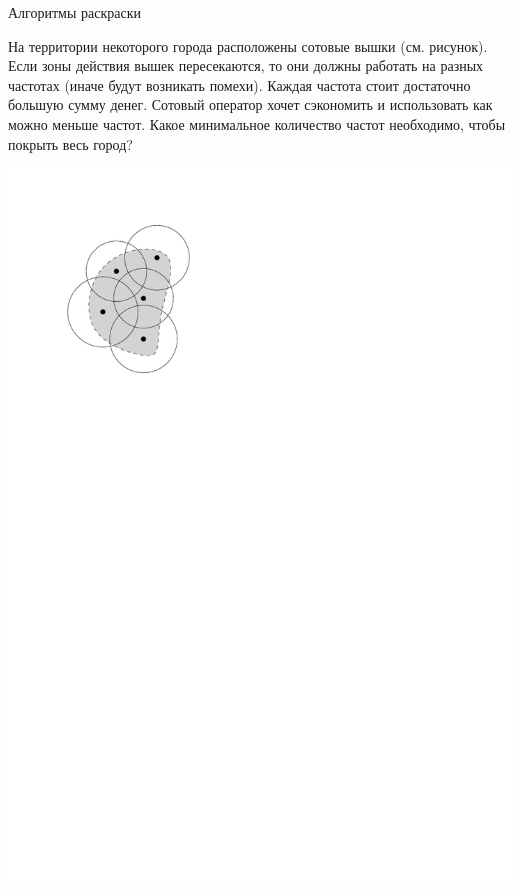 \begin{frame}{Алгоритмы раскраски}

\exmpl На территории некоторого города расположены сотовые вышки (см. рисунок). Если зоны действия вышек пересекаются, то они должны работать на разных частотах (иначе будут возникать помехи). Каждая частота стоит достаточно большую сумму денег. Сотовый оператор хочет сэкономить и использовать как можно меньше частот. Какое минимальное количество частот необходимо, чтобы покрыть весь город?


\begin{center}
\includegraphics[scale=0.7]{img/towers.pdf}
\end{center}

\end{frame}


